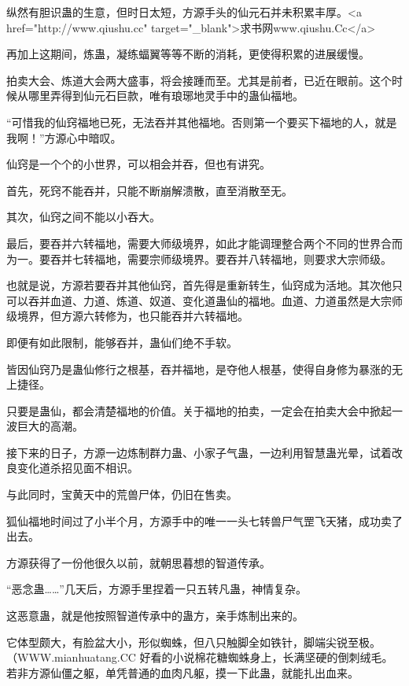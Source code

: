 
\begin{this_body}

纵然有胆识蛊的生意，但时日太短，方源手头的仙元石并未积累丰厚。<a href="http://www.qiushu.cc" target="\_blank">求书网www.qiushu.Cc</a>

再加上这期间，炼蛊，凝练蝠翼等等不断的消耗，更使得积累的进展缓慢。

拍卖大会、炼道大会两大盛事，将会接踵而至。尤其是前者，已近在眼前。这个时候从哪里弄得到仙元石巨款，唯有琅琊地灵手中的蛊仙福地。

“可惜我的仙窍福地已死，无法吞并其他福地。否则第一个要买下福地的人，就是我啊！”方源心中暗叹。

仙窍是一个个的小世界，可以相会并吞，但也有讲究。

首先，死窍不能吞并，只能不断崩解溃散，直至消散至无。

其次，仙窍之间不能以小吞大。

最后，要吞并六转福地，需要大师级境界，如此才能调理整合两个不同的世界合而为一。要吞并七转福地，需要宗师级境界。要吞并八转福地，则要求大宗师级。

也就是说，方源若要吞并其他仙窍，首先得是重新转生，仙窍成为活地。其次他只可以吞并血道、力道、炼道、奴道、变化道蛊仙的福地。血道、力道虽然是大宗师级境界，但方源六转修为，也只能吞并六转福地。

即便有如此限制，能够吞并，蛊仙们绝不手软。

皆因仙窍乃是蛊仙修行之根基，吞并福地，是夺他人根基，使得自身修为暴涨的无上捷径。

只要是蛊仙，都会清楚福地的价值。关于福地的拍卖，一定会在拍卖大会中掀起一波巨大的高潮。

接下来的日子，方源一边炼制群力蛊、小家子气蛊，一边利用智慧蛊光晕，试着改良变化道杀招见面不相识。

与此同时，宝黄天中的荒兽尸体，仍旧在售卖。

狐仙福地时间过了小半个月，方源手中的唯一一头七转兽尸气罡飞天猪，成功卖了出去。

方源获得了一份他很久以前，就朝思暮想的智道传承。

“恶念蛊……”几天后，方源手里捏着一只五转凡蛊，神情复杂。

这恶意蛊，就是他按照智道传承中的蛊方，亲手炼制出来的。

它体型颇大，有脸盆大小，形似蜘蛛，但八只触脚全如铁针，脚端尖锐至极。（WWW.mianhuatang.CC 好看的小说棉花糖蜘蛛身上，长满坚硬的倒刺绒毛。若非方源仙僵之躯，单凭普通的血肉凡躯，摸一下此蛊，就能扎出血来。


\end{this_body}
